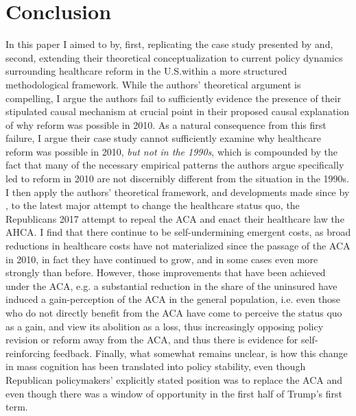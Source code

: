 \documentclass[11pt]{article}
\begin{document}
\section*{Conclusion}
In this paper I aimed to by, first, replicating the case study presented by \textcite[][]{Jacobs2014} and, second, extending their theoretical conceptualization to current policy dynamics surrounding healthcare reform in the U.S.within a more structured methodological framework. While the authors' theoretical argument is compelling, I argue the authors fail to sufficiently evidence the presence of their stipulated causal mechanism at crucial point in their proposed causal explanation of why reform was possible in 2010. As a natural consequence from this first failure, I argue their case study cannot sufficiently examine why healthcare reform was possible in 2010, \textit{but not in the 1990s}, which is compounded by the fact that many of the necessary empirical patterns the authors argue specifically led to reform in 2010 are not discernibly different from the situation in the 1990s. I then apply the authors' theoretical framework, and developments made since by \textcite[][]{Busemeyer2019}, to the latest major attempt to change the healthcare status quo, the Republicans 2017 attempt to repeal the ACA and enact their healthcare law the AHCA. I find that there continue to be self-undermining emergent costs, as broad reductions in healthcare costs have not materialized since the passage of the ACA in 2010, in fact they have continued to grow, and in some cases even more strongly than before. However, those improvements that have been achieved under the ACA, e.g. a substantial reduction in the share of the uninsured have induced a gain-perception of the ACA in the general population, i.e. even those who do not directly benefit from the ACA have come to perceive the status quo as a gain, and view its abolition as a loss, thus increasingly opposing policy revision or reform away from the ACA, and thus there is evidence for self-reinforcing feedback. Finally, what somewhat remains unclear, is how this change in mass cognition has been translated into policy stability, even though Republican policymakers' explicitly stated position was to replace the ACA and even though there was a window of opportunity in the first half of Trump's first term.
\end{document}

